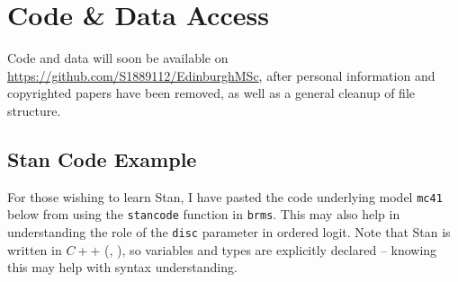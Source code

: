 \documentclass[11pt,twoside]{article}
\numberwithin{Theorem}{section}
\numberwithin{Definition}{section}
\numberwithin{Lemma}{section}
\numberwithin{Algorithm}{section}
\numberwithin{equation}{section}
\begin{document}
\clearpage

\newpage

\section{Code \& Data Access}

Code and data will soon be available on \url{https://github.com/S1889112/EdinburghMSc}, after personal information and copyrighted papers have been removed, as well as a general cleanup of file structure. 

\subsection{Stan Code Example}

For those wishing to learn Stan, I have pasted the code underlying model \texttt{mc41} below from using the \texttt{stancode} function in \texttt{brms}. This may also help in understanding the role of the \texttt{disc} parameter in ordered logit. Note that Stan is written in $C++$ (\citeauthor{CPP}, \citeyear{CPP}), so variables and types are explicitly declared -- knowing this may help with syntax understanding. 
\end{document}
